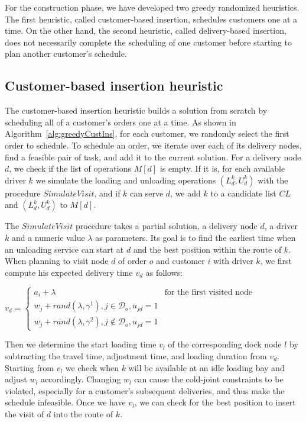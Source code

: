 \documentclass{article}
\begin{document}
For the construction phase, we have developed two greedy randomized heuristics. The first heuristic, called customer-based insertion, schedules customers one at a time. On the other hand, the second heuristic, called delivery-based insertion, does not necessarily complete the scheduling of one customer before starting to plan another customer's schedule.

\subsection{Customer-based insertion heuristic}

The customer-based insertion heuristic builds a solution from scratch by scheduling all of a customer's orders one at a time. As shown in Algorithm~\ref{alg:greedyCustIns}, for each customer, we randomly select the first order to schedule. To schedule an order, we iterate over each of its delivery nodes, find a feasible pair of task, and add it to the current solution. For a delivery node $d$, we check if the list of operations $M[d]$ is empty. If it is, for each available driver $k$ we simulate the loading and unloading operations $(L^k_d,U^k_d)$ with the procedure $SimulateVisit$, and if $k$ can serve $d$, we add $k$ to a candidate list $CL$ and $(L^k_d,U^k_d)$ to $M[d]$.

The $SimulateVisit$ procedure takes a partial solution, a delivery node $d$, a driver $k$ and a numeric value $\lambda$ as parameters. Its goal is to find the earliest time when an unloading service can start at $d$ and the best position within the route of $k$. When planning to visit node $d$ of order $o$ and customer $i$ with driver $k$, we first compute his expected delivery time $v_d$ as follows:

$ v_d = \left\{
    \begin{array}{rl}
        a_i + \lambda                                                   & \text{for the first visited node} \\
        w_j + rand(\lambda, \gamma^1), j \in \mathcal{D}_o,  u_{jd}=1   &                                   \\
        w_j + rand(\lambda, \gamma^2), j \notin \mathcal{D}_o, u_{jd}=1 &
    \end{array}
    \right.$

Then we determine the start loading time $v_l$ of the corresponding dock node $l$ by subtracting the travel time, adjustment time, and loading duration from $v_d$. Starting from $v_l$ we check when $k$ will be available at an idle loading bay and adjust $w_l$ accordingly. Changing $w_l$ can cause the cold-joint constraints to be violated, especially for a customer's subsequent deliveries, and thus make the schedule infeasible. Once we have $v_l$, we can check for the best position to insert the visit of $d$ into the route of $k$.
\end{document}
